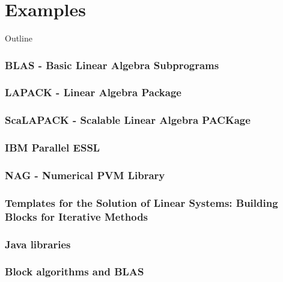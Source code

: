 

\subtitle{13 - Biblioteki numerycznej algebry liniowej}

  	\maketitle
	\part{Examples}
	\begin{frame}{Outline}
		\tableofcontents
	\end{frame}
	\section{BLAS - Basic Linear Algebra Subprograms}
	\section{LAPACK - Linear Algebra Package}
	\section{ScaLAPACK - Scalable Linear Algebra PACKage}
	\section{IBM Parallel ESSL}
	\section{NAG - Numerical PVM Library}
	\section{Templates for the Solution of Linear Systems: Building Blocks for Iterative Methods}
	\section{Java libraries}
	\section{Block algorithms and BLAS}
	
